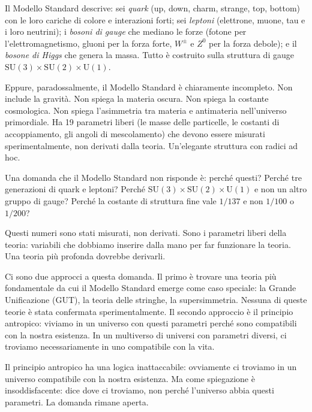 \documentclass[12pt,a4paper,openany]{book}
\newcommand{\sezione}[1]{\vspace{1.2em}{\large\bfseries #1}\vspace{0.5em}\par}
\begin{document}
Il Modello Standard descrive: sei \textit{quark} (up, down, charm, strange, top, bottom) con le loro cariche di colore e interazioni forti; sei \textit{leptoni} (elettrone, muone, tau e i loro neutrini); i \textit{bosoni di gauge} che mediano le forze (fotone per l'elettromagnetismo, gluoni per la forza forte, $W^\pm$ e $Z^0$ per la forza debole); e il \textit{bosone di Higgs} che genera la massa. Tutto è costruito sulla struttura di gauge $\mathrm{SU}(3) \times \mathrm{SU}(2) \times \mathrm{U}(1)$.

Eppure, paradossalmente, il Modello Standard è chiaramente incompleto. Non include la gravità. Non spiega la materia oscura. Non spiega la costante cosmologica. Non spiega l'asimmetria tra materia e antimateria nell'universo primordiale. Ha 19 parametri liberi (le masse delle particelle, le costanti di accoppiamento, gli angoli di mescolamento) che devono essere misurati sperimentalmente, non derivati dalla teoria. Un'elegante struttura con radici ad hoc.

\sezione{Perché esistono proprio queste particelle?}

Una domanda che il Modello Standard non risponde è: perché questi? Perché tre generazioni di quark e leptoni? Perché $\mathrm{SU}(3) \times \mathrm{SU}(2) \times \mathrm{U}(1)$ e non un altro gruppo di gauge? Perché la costante di struttura fine vale $1/137$ e non $1/100$ o $1/200$?

Questi numeri sono stati misurati, non derivati. Sono i parametri liberi della teoria: variabili che dobbiamo inserire dalla mano per far funzionare la teoria. Una teoria più profonda dovrebbe derivarli.

Ci sono due approcci a questa domanda. Il primo è trovare una teoria più fondamentale da cui il Modello Standard emerge come caso speciale: la Grande Unificazione (GUT), la teoria delle stringhe, la supersimmetria. Nessuna di queste teorie è stata confermata sperimentalmente. Il secondo approccio è il principio antropico: viviamo in un universo con questi parametri perché sono compatibili con la nostra esistenza. In un multiverso di universi con parametri diversi, ci troviamo necessariamente in uno compatibile con la vita.

Il principio antropico ha una logica inattaccabile: ovviamente ci troviamo in un universo compatibile con la nostra esistenza. Ma come spiegazione è insoddisfacente: dice dove ci troviamo, non perché l'universo abbia questi parametri. La domanda rimane aperta.

\sezione{La materia ordinaria e la vita}
\end{document}
